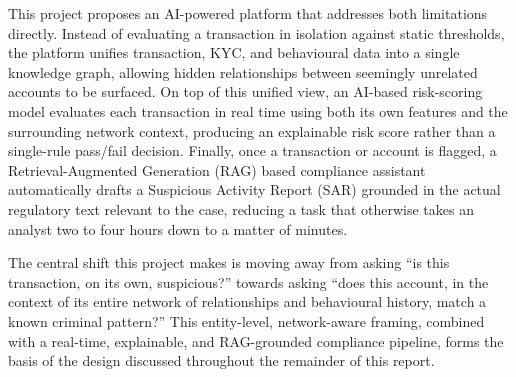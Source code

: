 This project proposes an AI-powered platform that addresses both limitations directly. Instead of evaluating a transaction in isolation against static thresholds, the platform unifies transaction, KYC, and behavioural data into a single knowledge graph, allowing hidden relationships between seemingly unrelated accounts to be surfaced. On top of this unified view, an AI-based risk-scoring model evaluates each transaction in real time using both its own features and the surrounding network context, producing an explainable risk score rather than a single-rule pass/fail decision. Finally, once a transaction or account is flagged, a Retrieval-Augmented Generation (RAG) based compliance assistant automatically drafts a Suspicious Activity Report (SAR) grounded in the actual regulatory text relevant to the case, reducing a task that otherwise takes an analyst two to four hours down to a matter of minutes.

The central shift this project makes is moving away from asking ``is this transaction, on its own, suspicious?'' towards asking ``does this account, in the context of its entire network of relationships and behavioural history, match a known criminal pattern?'' This entity-level, network-aware framing, combined with a real-time, explainable, and RAG-grounded compliance pipeline, forms the basis of the design discussed throughout the remainder of this report.

